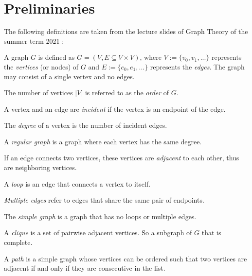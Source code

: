 \section{Preliminaries}\label{sec:prelimn}
The following definitions are taken from the lecture slides of Graph Theory of the summer term 2021 \cite{GraphTheorySchindelhaauer2021}:
\begin{definition}
    A graph $G$ is defined as $G = (V, E \subseteq V \times V)$, where $V := \{v_0, v_1,...\}$ represents the \textit{vertices} (or nodes) of $G$ and $E := \{e_0, e_1,...\}$ represents the \textit{edges}. The graph may consist of a single vertex and no edges.
\end{definition}

\begin{definition}
    The number of vertices $|V|$ is referred to as the \textit{order} of $G$.
    
    A vertex and an edge are \textit{incident} if the vertex is an endpoint of the edge.
    
    The \textit{degree} of a vertex is the number of incident edges.
\end{definition}

\begin{definition}
    A \textit{regular graph} is a graph where each vertex has the same degree.
\end{definition}

\begin{definition}[Adjacent]
    If an edge connects two vertices, these vertices are \textit{adjacent} to each other, thus are neighboring vertices.
\end{definition}
\begin{definition}
    A \textit{loop} is an edge that connects a vertex to itself.
    
    \textit{Multiple edges} refer to edges that share the same pair of endpoints.
    
    The \textit{simple graph} is a graph that has no loops or multiple edges.
\end{definition}

\begin{definition}[Clique]
    A \textit{clique} is a set of pairwise adjacent vertices. So a subgraph of $G$ that is complete.
\end{definition}

\begin{definition}[Path]
    A \textit{path} is a simple graph whose vertices can be ordered such that two vertices are adjacent if and only if they are consecutive in the list.
\end{definition}

